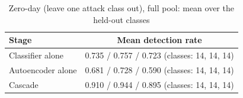 \begin{table}[H]
\centering
\small
\setlength{\tabcolsep}{3pt}
\renewcommand{\arraystretch}{1.15}
\begin{tabular}{|l|c|}
\hline
\textbf{Stage} & \textbf{Mean detection rate} \\ \hline
Classifier alone & 0.735 / 0.757 / 0.723 (classes: 14, 14, 14) \\ \hline
Autoencoder alone & 0.681 / 0.728 / 0.590 (classes: 14, 14, 14) \\ \hline
Cascade & 0.910 / 0.944 / 0.895 (classes: 14, 14, 14) \\ \hline
\end{tabular}
\caption{Zero-day (leave one attack class out), full pool: mean over the held-out classes}
\label{tab:full_zeroday_mean}
\end{table}

